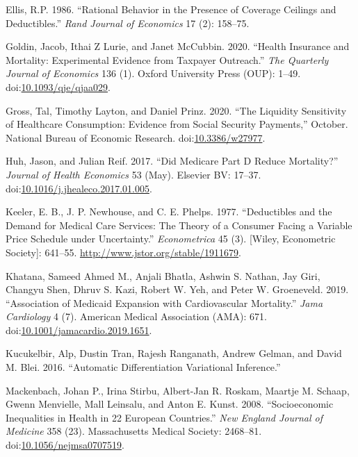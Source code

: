 \documentclass[a4paper,12pt]{article}
\begin{document}
\hypertarget{citeproc_bib_item_10}{Ellis, R.P. 1986. “Rational Behavior in the Presence of Coverage Ceilings and Deductibles.” \textit{Rand Journal of Economics} 17 (2): 158–75.}

\hypertarget{citeproc_bib_item_11}{Goldin, Jacob, Ithai Z Lurie, and Janet McCubbin. 2020. “Health Insurance and Mortality: Experimental Evidence from Taxpayer Outreach.” \textit{The Quarterly Journal of Economics} 136 (1). Oxford University Press (OUP): 1–49. doi:\href{https://doi.org/10.1093/qje/qjaa029}{10.1093/qje/qjaa029}.}

\hypertarget{citeproc_bib_item_12}{Gross, Tal, Timothy Layton, and Daniel Prinz. 2020. “The Liquidity Sensitivity of Healthcare Consumption: Evidence from Social Security Payments,” October. National Bureau of Economic Research. doi:\href{https://doi.org/10.3386/w27977}{10.3386/w27977}.}

\hypertarget{citeproc_bib_item_13}{Huh, Jason, and Julian Reif. 2017. “Did Medicare Part D Reduce Mortality?” \textit{Journal of Health Economics} 53 (May). Elsevier BV: 17–37. doi:\href{https://doi.org/10.1016/j.jhealeco.2017.01.005}{10.1016/j.jhealeco.2017.01.005}.}

\hypertarget{citeproc_bib_item_14}{Keeler, E. B., J. P. Newhouse, and C. E. Phelps. 1977. “Deductibles and the Demand for Medical Care Services: The Theory of a Consumer Facing a Variable Price Schedule under Uncertainty.” \textit{Econometrica} 45 (3). [Wiley, Econometric Society]: 641–55. \url{http://www.jstor.org/stable/1911679}.}

\hypertarget{citeproc_bib_item_15}{Khatana, Sameed Ahmed M., Anjali Bhatla, Ashwin S. Nathan, Jay Giri, Changyu Shen, Dhruv S. Kazi, Robert W. Yeh, and Peter W. Groeneveld. 2019. “Association of Medicaid Expansion with Cardiovascular Mortality.” \textit{Jama Cardiology} 4 (7). American Medical Association (AMA): 671. doi:\href{https://doi.org/10.1001/jamacardio.2019.1651}{10.1001/jamacardio.2019.1651}.}

\hypertarget{citeproc_bib_item_16}{Kucukelbir, Alp, Dustin Tran, Rajesh Ranganath, Andrew Gelman, and David M. Blei. 2016. “Automatic Differentiation Variational Inference.”}

\hypertarget{citeproc_bib_item_17}{Mackenbach, Johan P., Irina Stirbu, Albert-Jan R. Roskam, Maartje M. Schaap, Gwenn Menvielle, Mall Leinsalu, and Anton E. Kunst. 2008. “Socioeconomic Inequalities in Health in 22 European Countries.” \textit{New England Journal of Medicine} 358 (23). Massachusetts Medical Society: 2468–81. doi:\href{https://doi.org/10.1056/nejmsa0707519}{10.1056/nejmsa0707519}.}
\end{document}
